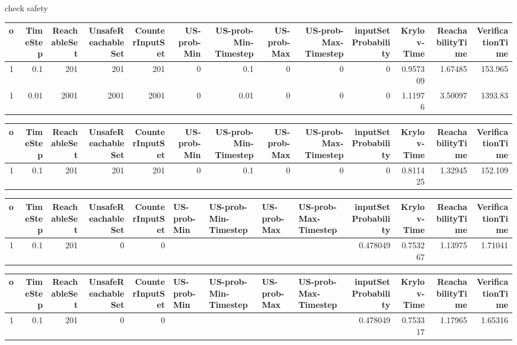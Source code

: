 check safety
\begin{tabular}{rrrrrrrrrrrrr}
\hline
   o &   TimeStep &   ReachableSet &   UnsafeReachableSet &   CounterInputSet &   US-prob-Min &   US-prob-Min-Timestep &   US-prob-Max &   US-prob-Max-Timestep &   inputSet Probability &   Krylov-Time &   ReachabilityTime &   VerificationTime \\
\hline
   1 &       0.1  &            201 &                  201 &               201 &             0 &                   0.1  &             0 &                      0 &                      0 &      0.957309 &            1.67485 &            153.965 \\
   1 &       0.01 &           2001 &                 2001 &              2001 &             0 &                   0.01 &             0 &                      0 &                      0 &      1.11976  &            3.50097 &           1393.83  \\
\hline
\end{tabular}
\begin{tabular}{rrrrrrrrrrrrr}
\hline
   o &   TimeStep &   ReachableSet &   UnsafeReachableSet &   CounterInputSet &   US-prob-Min &   US-prob-Min-Timestep &   US-prob-Max &   US-prob-Max-Timestep &   inputSet Probability &   Krylov-Time &   ReachabilityTime &   VerificationTime \\
\hline
   1 &        0.1 &            201 &                  201 &               201 &             0 &                    0.1 &             0 &                      0 &                      0 &      0.811425 &            1.32945 &            152.109 \\
\hline
\end{tabular}
\begin{tabular}{rrrrrllllrrrr}
\hline
   o &   TimeStep &   ReachableSet &   UnsafeReachableSet &   CounterInputSet & US-prob-Min   & US-prob-Min-Timestep   & US-prob-Max   & US-prob-Max-Timestep   &   inputSet Probability &   Krylov-Time &   ReachabilityTime &   VerificationTime \\
\hline
   1 &        0.1 &            201 &                    0 &                 0 &               &                        &               &                        &               0.478049 &      0.753267 &            1.13975 &            1.71041 \\
\hline
\end{tabular}
\begin{tabular}{rrrrrllllrrrr}
\hline
   o &   TimeStep &   ReachableSet &   UnsafeReachableSet &   CounterInputSet & US-prob-Min   & US-prob-Min-Timestep   & US-prob-Max   & US-prob-Max-Timestep   &   inputSet Probability &   Krylov-Time &   ReachabilityTime &   VerificationTime \\
\hline
   1 &        0.1 &            201 &                    0 &                 0 &               &                        &               &                        &               0.478049 &      0.753317 &            1.17965 &            1.65316 \\
\hline
\end{tabular}
